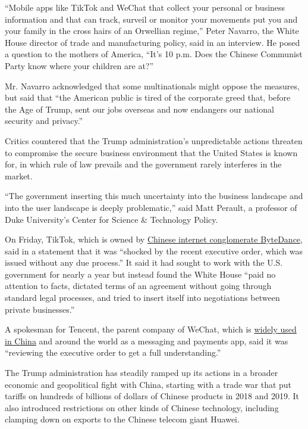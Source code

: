 ``Mobile apps like TikTok and WeChat that collect your personal or
business information and that can track, surveil or monitor your
movements put you and your family in the cross hairs of an Orwellian
regime,'' Peter Navarro, the White House director of trade and
manufacturing policy, said in an interview. He posed a question to the
mothers of America, ``It's 10 p.m. Does the Chinese Communist Party know
where your children are at?''

Mr. Navarro acknowledged that some multinationals might oppose the
measures, but said that ``the American public is tired of the corporate
greed that, before the Age of Trump, sent our jobs overseas and now
endangers our national security and privacy.''

Critics countered that the Trump administration's unpredictable actions
threaten to compromise the secure business environment that the United
States is known for, in which rule of law prevails and the government
rarely interferes in the market.

``The government inserting this much uncertainty into the business
landscape and into the user landscape is deeply problematic,'' said Matt
Perault, a professor of Duke University's Center for Science \&
Technology Policy.

On Friday, TikTok, which is owned by
\href{https://www.nytimes3xbfgragh.onion/2018/10/29/technology/bytedance-app-funding-china.html}{Chinese
internet conglomerate ByteDance}, said in a statement that it was
``shocked by the recent executive order, which was issued without any
due process.'' It said it had sought to work with the U.S. government
for nearly a year but instead found the White House ``paid no attention
to facts, dictated terms of an agreement without going through standard
legal processes, and tried to insert itself into negotiations between
private businesses.''

A spokesman for Tencent, the parent company of WeChat, which is
\href{https://www.nytimes3xbfgragh.onion/video/technology/100000004574648/china-internet-wechat.html}{widely
used in China} and around the world as a messaging and payments app,
said it was ``reviewing the executive order to get a full
understanding.''

The Trump administration has steadily ramped up its actions in a broader
economic and geopolitical fight with China, starting with a trade war
that put tariffs on hundreds of billions of dollars of Chinese products
in 2018 and 2019. It also introduced restrictions on other kinds of
Chinese technology, including clamping down on exports to the Chinese
telecom giant Huawei.

